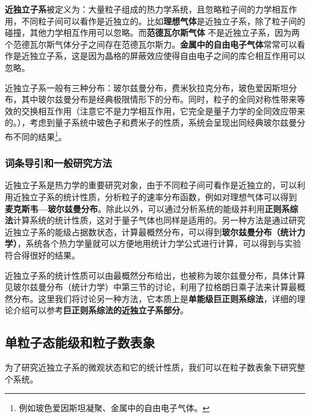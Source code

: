 

\textbf{近独立子系}被定义为：大量粒子组成的热力学系统，且忽略粒子间的力学相互作用，不同粒子间可以看作是近独立的。比如\textbf{理想气体}是近独立子系，除了粒子间的碰撞，其他力学相互作用可以忽略。而\textbf{范德瓦尔斯气体} 不是近独立子系，因为两个范德瓦尔斯气体分子之间存在范德瓦尔斯力。\textbf{金属中的自由电子气体}常常可以看作是近独立子系，这是因为晶格的屏蔽效应使得自由电子之间的库仑相互作用可以忽略。

近独立子系一般有三种分布：玻尔兹曼分布，费米狄拉克分布，玻色爱因斯坦分布，其中玻尔兹曼分布是经典极限情形下的分布。同时，粒子的全同对称性带来等效的交换相互作用（注意它不是力学相互作用，它完全是量子力学的全同效应带来的。），考虑到量子系统中玻色子和费米子的性质，系统会呈现出同经典玻尔兹曼分布不同的结果\footnote{例如玻色爱因斯坦凝聚、金属中的自由电子气体。}。

\subsubsection{词条导引和一般研究方法}
近独立子系是热力学的重要研究对象，由于不同粒子间可看作是近独立的，可以利用近独立子系的统计性质，分析粒子的速率分布函数，例如对理想气体可以得到 \textbf{麦克斯韦—玻尔兹曼分布}。除此以外，可以通过分析系统的能级并利用\textbf{正则系综法}计算系统的统计性质，这对于量子气体也同样是适用的。另一种方法是通过研究近独立子系的能级占据数状态，计算最概然分布，可以得到\textbf{玻尔兹曼分布（统计力学）}，系统各个热力学量就可以方便地用统计力学公式进行计算，可以得到与实验符合得很好的结果。

近独立子系的统计性质可以由最概然分布给出，也被称为玻尔兹曼分布，具体计算见玻尔兹曼分布（统计力学）中第三节的讨论，利用了拉格朗日乘子法来计算最概然分布。这里我们将讨论另一种方法，它本质上是\textbf{单能级巨正则系综法}，详细的理论介绍可以参考\textbf{巨正则系综法的近独立子系部分}。

\subsection{单粒子态能级和粒子数表象}
为了研究近独立子系的微观状态和它的统计性质，我们可以在粒子数表象下研究整个系统。

